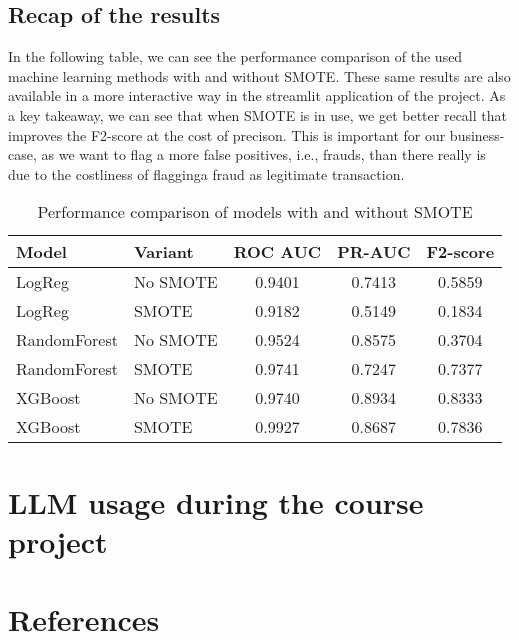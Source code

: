 \documentclass{article}
\begin{document}
\subsection{Recap of the results}

In the following table, we can see the performance comparison of the used machine learning methods with and without SMOTE. These same results are also available in a more interactive way in the streamlit application of the project. As a key takeaway, we can see that when SMOTE is in use, we get better recall that improves the F2-score at the cost of precison. This is important for our business-case, as we want to flag a more false positives, i.e., frauds, than there really is due to the costliness of flagginga fraud as legitimate transaction.

\begin{table}[h]
\centering
\begin{tabular}{llccc}
\toprule
Model & Variant & ROC AUC & PR-AUC & F2-score \\
\midrule
LogReg        & No SMOTE & 0.9401 & 0.7413 & 0.5859 \\
LogReg        & SMOTE    & 0.9182 & 0.5149 & 0.1834 \\
RandomForest  & No SMOTE & 0.9524 & 0.8575 & 0.3704 \\
RandomForest  & SMOTE    & 0.9741 & 0.7247 & 0.7377 \\
XGBoost       & No SMOTE & 0.9740 & 0.8934 & 0.8333 \\
XGBoost       & SMOTE    & 0.9927 & 0.8687 & 0.7836 \\
\bottomrule
\end{tabular}

\caption{Performance comparison of models with and without SMOTE}
\label{tab:model_performance}
\end{table}


\section{LLM usage during the course project}

\section{References}
\end{document}

